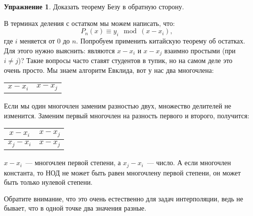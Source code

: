 \documentclass[russian]{lecture-notes}
\theoremstyle{definition}
\newtheorem*{exercise}{Упражнение}
\begin{document}
    \begin{exercise}
        Доказать теорему Безу в обратную сторону.
    \end{exercise}

    \noindent В терминах деления с остатком мы можем написать, что:
    \[
        P_n(x) \equiv y_i \mod{(x - x_i)},
    \]
    где $i$ меняется от $0$ до $n$. Попробуем применить китайскую теорему об остатках. Для этого нужно выяснить: являются $x - x_i$ и $x - x_j$ взаимно простыми (при $i \ne j$)? Такие вопросы часто ставят студентов в тупик, но на самом деле это очень просто. Мы знаем алгоритм Евклида, вот у нас два многочлена:
    \begin{table}[H]
        \centering
        \begin{tabular}{c|c}
            $x - x_i$ & $x - x_j$
        \end{tabular}
    \end{table}

    Если мы один многочлен заменим разностью двух, множество делителей не изменится. Заменим первый многочлен на разность первого и второго, получится:
    \begin{table}[H]
        \centering
        \begin{tabular}{c|c}
            $x - x_i$ & $x - x_j$ \\ \hline
            $x_j - x_i$ & $x - x_j$
        \end{tabular}
    \end{table}

    $x - x_i$~--- многочлен первой степени, а $x_j - x_i$~--- число. А если многочлен константа, то НОД не может быть равен многочлену первой степени, он может быть только нулевой степени.

    Обратите внимание, что это очень естественно для задач интерполяции, ведь не бывает, что в одной точке два значения разные.
\end{document}
